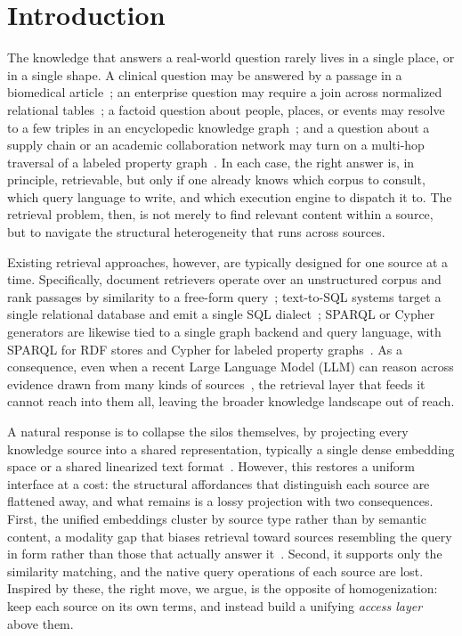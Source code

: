 \section{Introduction}



The knowledge that answers a real-world question rarely lives in a single place, or in a single shape. A clinical question may be answered by a passage in a biomedical article~\citep{BEIR}; an enterprise question may require a join across normalized relational tables~\citep{Spider, Bird}; a factoid question about people, places, or events may resolve to a few triples in an encyclopedic knowledge graph~\citep{Freebase, Wikidata}; and a question about a supply chain or an academic collaboration network may turn on a multi-hop traversal of a labeled property graph~\citep{Text2Cypher}. In each case, the right answer is, in principle, retrievable, but only if one already knows which corpus to consult, which query language to write, and which execution engine to dispatch it to. The retrieval problem, then, is not merely to find relevant content within a source, but to navigate the structural heterogeneity that runs across sources.

Existing retrieval approaches, however, are typically designed for one source at a time. Specifically, document retrievers operate over an unstructured corpus and rank passages by similarity to a free-form query~\citep{BM25, DPR}; text-to-SQL systems target a single relational database and emit a single SQL dialect~\citep{Spider, Bird}; SPARQL or Cypher generators are likewise tied to a single graph backend and query language, with SPARQL for RDF stores and Cypher for labeled property graphs~\citep{Text2SPARQL, Text2Cypher}. As a consequence, even when a recent Large Language Model (LLM) can reason across evidence drawn from many kinds of sources~\citep{Claude3, Gemini-2.5, GPT-5}, the retrieval layer that feeds it cannot reach into them all, leaving the broader knowledge landscape out of reach.

A natural response is to collapse the silos themselves, by projecting every knowledge source into a shared representation, typically a single dense embedding space or a shared linearized text format~\citep{UniK, UDT, DiFaR}. However, this restores a uniform interface at a cost: the structural affordances that distinguish each source are flattened away, and what remains is a lossy projection with two consequences. First, the unified embeddings cluster by source type rather than by semantic content, a modality gap that biases retrieval toward sources resembling the query in form rather than those that actually answer it~\citep{UniversalRAG}. Second, it supports only the similarity matching, and the native query operations of each source are lost. Inspired by these, the right move, we argue, is the opposite of homogenization: keep each source on its own terms, and instead build a unifying \emph{access layer} above them.

